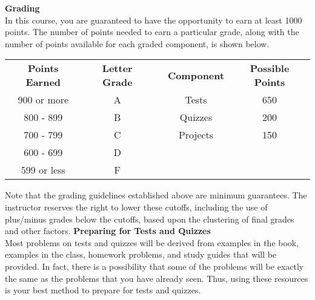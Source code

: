 \documentclass[addpoints,12pt]{exam}
\begin{document}
\wl
\noindent \textbf{Grading} \\
In this course, you are guaranteed to have the opportunity to earn at least 1000 points. The number of points needed to earn a particular grade, along with the number of points available for each graded component, is shown below.

\begin{table}[h] \sffamily \centering
\begin{tabular}{|c|c|lcc}
\cline{1-2} \cline{4-5} 
\textbf{Points Earned} & \textbf{Letter Grade} &             \multicolumn{1}{l|}{}            & \multicolumn{1}{c|}{\textbf{Component}}                    &    \multicolumn{1}{c|}{\textbf{Possible Points}}                                           \\ \cline{1-2} \cline{4-5} 
900 or more          & A                     & \multicolumn{1}{l|}{} & \multicolumn{1}{c|}{Tests} & \multicolumn{1}{c|}{650} \\ \cline{1-2} \cline{4-5} 
800 - 899              & B                     & \multicolumn{1}{l|}{} & \multicolumn{1}{c|}{Quizzes}              & \multicolumn{1}{c|}{200}                      \\ \cline{1-2} \cline{4-5} 
700 - 799                & C                     & \multicolumn{1}{l|}{} & \multicolumn{1}{c|}{Projects}            & \multicolumn{1}{c|}{150}                      \\ \cline{1-2} \cline{4-5} 
600 - 699                & D                     & \multicolumn{1}{l}{} & \multicolumn{1}{c}{}            & \multicolumn{1}{c}{}                      \\ \cline{1-2}
599 or less          & F                     &         \hspace{1.5cm}                & \multicolumn{1}{l}{}                    &                                               \\ \cline{1-2}
\end{tabular}
\end{table}
\noindent Note that the grading guidelines established above are minimum guarantees. The instructor reserves the right to lower these cutoffs, including the use of plus/minus grades below the cutoffs, based upon the clustering of final grades and other factors.
\newpage
\noindent \textbf{Preparing for Tests and Quizzes} \\
Most problems on tests and quizzes will be derived from examples in the book, examples in the class, homework problems, and study guides that will be provided. In fact, there is a possibility that some of the problems will be exactly the same as the problems that you have already seen. Thus, using these resources is your best method to prepare for tests and quizzes.
\end{document}
